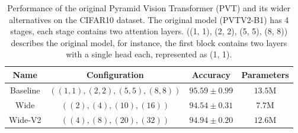 \begin{table*}[!h]
	\caption{
		Performance of the original Pyramid Vision Transformer (PVT) and its wider alternatives on the CIFAR10 dataset.
		The original model (PVTV2-B1) has 4 stages, each stage contains two attention layers.
		((1, 1), (2, 2), (5, 5), (8, 8)) describes the original model,
		for instance, the first block contains two layers with a single head each, represented as (1, 1).}
	\centering
	\begin{tabular}{c|ccc}
	\toprule
	\textbf{Name}
	& \textbf{Configuration}
	& \textbf{Accuracy}
	& \textbf{Parameters} \\
	\midrule
	Baseline
	& $((1, 1), (2, 2), (5, 5), (8, 8))$
	& $95.59 \pm 0.99$	
	& $13.5$M	 \\
	Wide
	& $((2), (4), (10), (16))$
	& $94.54 \pm 0.31$	
	& $7.7$M	 \\
	Wide-V2
	& $((4), (8), (20), (32))$
	& $94.94 \pm 0.20$	
	& $12.6$M	 \\
	\bottomrule
	\end{tabular}
	\label{tab:vit}
\end{table*}
